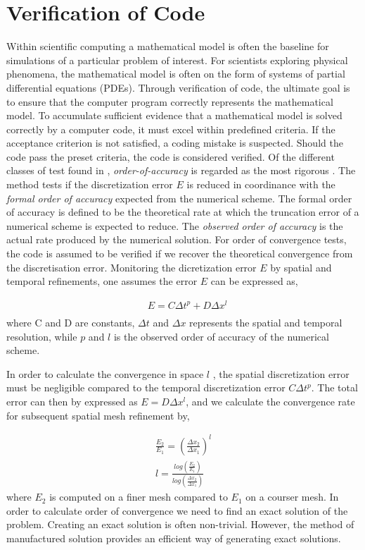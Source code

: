 \section{Verification of Code}
Within scientific computing a mathematical model is often the baseline for simulations of a particular problem of interest. For scientists exploring physical phenomena, the mathematical model is often on the form of systems of partial differential equations (PDEs). 
Through verification of code, the ultimate goal is to ensure that the computer program correctly represents the mathematical model. To accumulate sufficient evidence that a mathematical model is solved correctly by a computer code, it must excel within predefined criteria. If the acceptance criterion is not satisfied, a coding mistake is suspected. Should the code pass the preset criteria, the code is considered verified. Of the different classes of test found in \cite{Roache},  \textit{order-of-accuracy} is regarded as the most rigorous  \cite{Biggs, Roache, Etienne2006}. The method tests if the discretization error $E$ is reduced in coordinance with the \textit{formal order of accuracy} expected from the numerical scheme. The formal order of accuracy is defined to be the theoretical rate at which the truncation error of a numerical scheme is expected to reduce. The \textit{observed order of accuracy} is the actual rate produced by the numerical solution.
For order of convergence tests, the code is assumed to be verified if we recover the theoretical convergence from the discretisation error. Monitoring the dicretization error $E$ by spatial and temporal refinements, one assumes the error $E$ can be expressed as,

\begin{align*}
&E = C\Delta t^p + D\Delta x^l\\
\end{align*} 
where C and D are constants, $\Delta t$ and $\Delta x$ represents the spatial and temporal resolution, while $p$ and $l$ is the observed order of accuracy of the numerical scheme. 

In order to calculate the convergence in space $l$ , the spatial discretization error must be negligible compared to the temporal discretization error $C\Delta t^p$. The total error can then by expressed as $E =  D\Delta x^l$, and we calculate the convergence rate for subsequent spatial mesh refinement by,

\begin{align}
\frac{E_2}{E_1} = (\frac{\Delta x_2}{\Delta x_1})^l \\
l = \frac{log (\frac{E_2}{E_1})}{ log (\frac{\Delta x_2}{\Delta x_1}) }
\end{align}
where $E_2$ is computed on a finer mesh compared to $E_1$ on a courser mesh. In order to calculate order of convergence we need to find an exact solution of the problem. Creating an exact solution is often non-trivial. However, the method of manufactured solution provides an efficient way of generating exact solutions.

